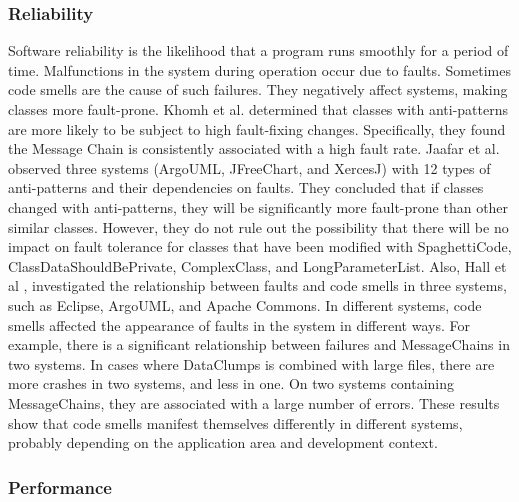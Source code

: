 \documentclass{sigchi}
\begin{document}
\subsubsection{Reliability}
Software reliability is the likelihood that a program runs smoothly for a period of time. Malfunctions in the system during operation occur due to faults. Sometimes code smells are the cause of such failures. They negatively affect systems, making classes more fault-prone. 
Khomh  et al. \cite{Khomh} determined that classes with anti-patterns are more likely to be subject to high fault-fixing changes. Specifically, they found the Message Chain is consistently associated with a high fault rate. Jaafar et al. \cite{Jaafar} observed three systems (ArgoUML, JFreeChart, and XercesJ) with 12 types of anti-patterns and their dependencies on faults. They concluded that if classes changed with anti-patterns, they will be significantly more fault-prone than other similar classes. However, they do not rule out the possibility that there will be no impact on fault tolerance for classes that have been modified with SpaghettiCode, ClassDataShouldBePrivate, ComplexClass, and LongParameterList. Also, Hall et al \cite{Hall}, investigated the relationship between faults and code smells in three systems, such as Eclipse, ArgoUML, and Apache Commons. In different systems, code smells affected the appearance of faults in the system in different ways. For example, there is a significant relationship between failures and MessageChains in two systems. In cases where DataClumps is combined with large files, there are more crashes in two systems, and less in one. On two systems containing MessageChains, they are associated with a large number of errors. These results show that code smells manifest themselves differently in different systems, probably depending on the application area and development context.

\subsubsection{Performance}
\end{document}
